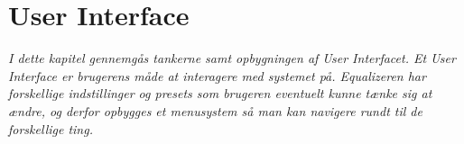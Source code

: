 \chapter{User Interface}\label{kap:ui}

\emph{I dette kapitel gennemgås tankerne samt opbygningen af User Interfacet. Et User Interface er brugerens måde at interagere med systemet på. Equalizeren har forskellige indstillinger og presets som brugeren eventuelt kunne tænke sig at ændre, og derfor opbygges et menusystem så man kan navigere rundt til de forskellige ting. \\
}